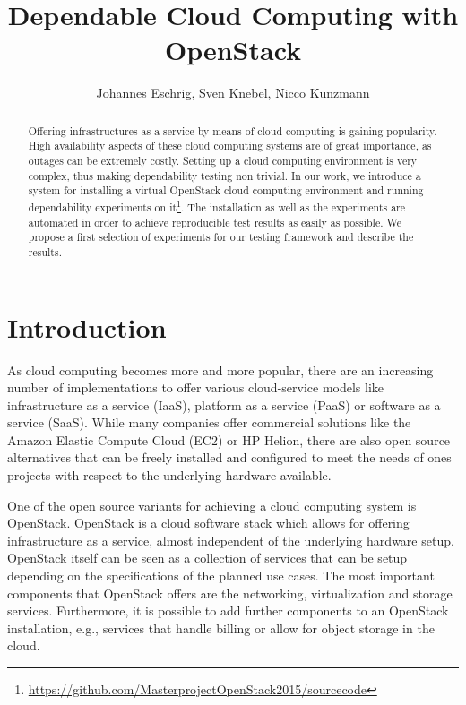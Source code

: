 
\title{Dependable Cloud Computing with OpenStack}
\author{Johannes Eschrig, Sven Knebel, Nicco Kunzmann}
\date{}

\maketitle

\begin{abstract}
Offering infrastructures as a service by means of cloud computing is gaining popularity. High availability aspects of these cloud computing systems are of great importance, as outages can be extremely costly. Setting up a cloud computing environment is very complex, thus making dependability testing non trivial. In our work, we introduce a system for installing a virtual OpenStack cloud computing environment and running dependability experiments on it\footnote{\url{https://github.com/MasterprojectOpenStack2015/sourcecode}}. The installation as well as the experiments are automated in order to achieve reproducible test results as easily as possible. We propose a first selection of experiments for our testing framework and describe the results.
\end{abstract}



\section{Introduction}
As cloud computing becomes more and more popular, there are an increasing number of  implementations to offer various cloud-service models like infrastructure as a service (IaaS), platform as a service (PaaS) or software as a service (SaaS). While many companies offer commercial solutions like the Amazon Elastic Compute Cloud (EC2) or HP Helion, there are also open source alternatives that can be freely installed and configured to meet the needs of ones projects with respect to the underlying hardware available.

One of the open source variants for achieving a cloud computing system is OpenStack. OpenStack is a cloud software stack which allows for offering infrastructure as a service, almost independent of the underlying hardware setup. OpenStack itself can be seen as a collection of services that can be setup depending on the specifications of the planned use cases. The most important components that OpenStack offers are the networking, virtualization and storage services. Furthermore, it is possible to add further components to an OpenStack installation, e.g., services that handle billing or allow for object storage in the cloud. 

